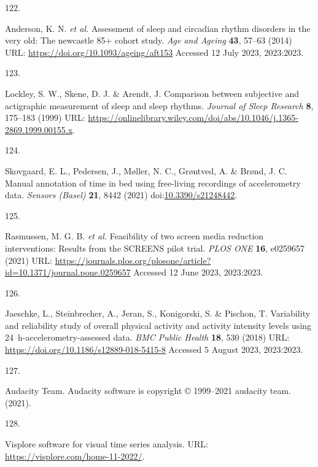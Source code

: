 \documentclass[
  10pt,
]{scrbook}
\newlength{\cslhangindent}
\newlength{\csllabelwidth}
\newlength{\cslentryspacingunit} %
\newenvironment{CSLReferences}[2] %
 {%
  \setlength{\parindent}{0pt}
  \ifodd #1
  \let\oldpar\par
  \def\par{\hangindent=\cslhangindent\oldpar}
  \fi
  \setlength{\parskip}{#2\cslentryspacingunit}
 }%
 {}
\newcommand{\CSLLeftMargin}[1]{\parbox[t]{\csllabelwidth}{#1}}
\newcommand{\CSLRightInline}[1]{\parbox[t]{\linewidth - \csllabelwidth}{#1}\break}
\let\originaltextbf\textbf
\renewcommand{\textbf}[1]{\textcolor{color1}{\originaltextbf{#1}}}
\begin{document}
\begin{CSLReferences}{0}{0}
\leavevmode{}%
\CSLLeftMargin{122. }%
\CSLRightInline{Anderson, K. N. \emph{et al.} Assessment of sleep and
circadian rhythm disorders in the very old: The newcastle 85+ cohort
study. \emph{Age and Ageing} \textbf{43}, 57--63 (2014) URL:
\url{https://doi.org/10.1093/ageing/aft153} Accessed 12 July 2023,
2023:2023.}

\leavevmode{}%
\CSLLeftMargin{123. }%
\CSLRightInline{Lockley, S. W., Skene, D. J. \& Arendt, J. Comparison
between subjective and actigraphic measurement of sleep and sleep
rhythms. \emph{Journal of Sleep Research} \textbf{8}, 175--183 (1999)
URL:
\url{https://onlinelibrary.wiley.com/doi/abs/10.1046/j.1365-2869.1999.00155.x}.}

\leavevmode{}%
\CSLLeftMargin{124. }%
\CSLRightInline{Skovgaard, E. L., Pedersen, J., Møller, N. C., Grøntved,
A. \& Brønd, J. C. Manual annotation of time in bed using free-living
recordings of accelerometry data. \emph{Sensors (Basel)} \textbf{21},
8442 (2021)
doi:\href{https://doi.org/10.3390/s21248442}{10.3390/s21248442}.}

\leavevmode{}%
\CSLLeftMargin{125. }%
\CSLRightInline{Rasmussen, M. G. B. \emph{et al.} Feasibility of two
screen media reduction interventions: Results from the {SCREENS} pilot
trial. \emph{{PLOS} {ONE}} \textbf{16}, e0259657 (2021) URL:
\url{https://journals.plos.org/plosone/article?id=10.1371/journal.pone.0259657}
Accessed 12 June 2023, 2023:2023.}

\leavevmode{}%
\CSLLeftMargin{126. }%
\CSLRightInline{Jaeschke, L., Steinbrecher, A., Jeran, S., Konigorski,
S. \& Pischon, T. Variability and reliability study of overall physical
activity and activity intensity levels using 24~h-accelerometry-assessed
data. \emph{{BMC} Public Health} \textbf{18}, 530 (2018) URL:
\url{https://doi.org/10.1186/s12889-018-5415-8} Accessed 5 August 2023,
2023:2023.}

\leavevmode{}%
\CSLLeftMargin{127. }%
\CSLRightInline{Audacity Team. Audacity\textregistered{} software is
copyright © 1999--2021 audacity team. (2021).}

\leavevmode{}%
\CSLLeftMargin{128. }%
\CSLRightInline{Visplore {\textendash} software for visual time series
analysis. URL: \url{https://visplore.com/home-11-2022/}.}


\end{CSLReferences}
\end{document}
